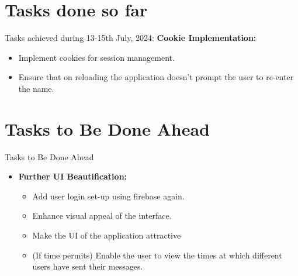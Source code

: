 \documentclass{beamer}
\begin{document}
\section{Tasks done so far}

\begin{frame}{Tasks achieved during 13-15th July, 2024:}
    \textbf{Cookie Implementation:}
        \begin{itemize}
            \item Implement cookies for session management.
            \item Ensure that on reloading the application doesn't prompt the user to re-enter the name.
        \end{itemize}
\end{frame}

\section{Tasks to Be Done Ahead}

\begin{frame}{Tasks to Be Done Ahead}
    \begin{itemize}
        \item \textbf{Further UI Beautification:}
        \begin{itemize}
            \item Add user login set-up using firebase again.
            \item Enhance visual appeal of the interface.
            \item Make the UI of the application attractive
            \item (If time permits) Enable the user to view the times at which different users have sent their messages.
        \end{itemize}
    \end{itemize}
\end{frame}
\end{document}
